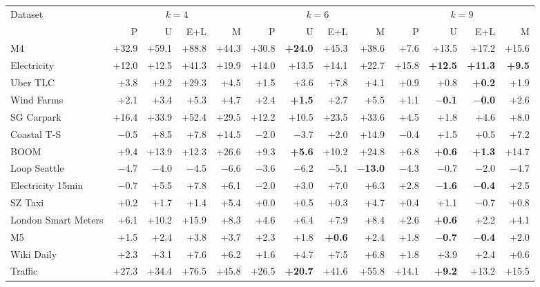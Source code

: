 \begin{tabular}{lrrrrrrrrrrrr}
\toprule
Dataset & \multicolumn{4}{c}{$k=4$} & \multicolumn{4}{c}{$k=6$} & \multicolumn{4}{c}{$k=9$} \\
\cmidrule(lr){2-5}\cmidrule(lr){6-9}\cmidrule(lr){10-13}
 & P & U & E+L & M & P & U & E+L & M & P & U & E+L & M \\
\midrule
M4 & +32.9 & +59.1 & +88.8 & +44.3 & +30.8 & \textbf{+24.0} & +45.3 & +38.6 & +7.6 & +13.5 & +17.2 & +15.6 \\
Electricity & +12.0 & +12.5 & +41.3 & +19.9 & +14.0 & +13.5 & +14.1 & +22.7 & +15.8 & \textbf{+12.5} & \textbf{+11.3} & \textbf{+9.5} \\
Uber TLC & +3.8 & +9.2 & +29.3 & +4.5 & +1.5 & +3.6 & +7.8 & +4.1 & +0.9 & +0.8 & \textbf{+0.2} & +1.9 \\
Wind Farms & +2.1 & +3.4 & +5.3 & +4.7 & +2.4 & \textbf{+1.5} & +2.7 & +5.5 & +1.1 & \textbf{$-$0.1} & \textbf{$-$0.0} & +2.6 \\
SG Carpark & +16.4 & +33.9 & +52.4 & +29.5 & +12.2 & +10.5 & +23.5 & +33.6 & +4.5 & +1.8 & +4.6 & +8.0 \\
Coastal T-S & $-$0.5 & +8.5 & +7.8 & +14.5 & $-$2.0 & $-$3.7 & +2.0 & +14.9 & $-$0.4 & +1.5 & +0.5 & +7.2 \\
BOOM & +9.4 & +13.9 & +12.3 & +26.6 & +9.3 & \textbf{+5.6} & +10.2 & +24.8 & +6.8 & \textbf{+0.6} & \textbf{+1.3} & +14.7 \\
Loop Seattle & $-$4.7 & $-$4.0 & $-$4.5 & $-$6.6 & $-$3.6 & $-$6.2 & $-$5.1 & \textbf{$-$13.0} & $-$4.3 & $-$0.7 & $-$2.0 & $-$4.7 \\
Electricity 15min & $-$0.7 & +5.5 & +7.8 & +6.1 & $-$2.0 & +3.0 & +7.0 & +6.3 & +2.8 & \textbf{$-$1.6} & \textbf{$-$0.4} & +2.5 \\
SZ Taxi & +0.2 & +1.7 & +1.4 & +5.4 & +0.0 & +0.5 & +0.3 & +4.7 & +0.4 & +1.1 & $-$0.7 & +0.8 \\
London Smart Meters & +6.1 & +10.2 & +15.9 & +8.3 & +4.6 & +6.4 & +7.9 & +8.4 & +2.6 & \textbf{+0.6} & +2.2 & +4.1 \\
M5 & +1.5 & +2.4 & +3.8 & +3.7 & +2.3 & +1.8 & \textbf{+0.6} & +2.4 & +1.8 & \textbf{$-$0.7} & \textbf{$-$0.4} & +2.0 \\
Wiki Daily & +2.3 & +3.1 & +7.6 & +6.2 & +1.6 & +4.7 & +7.5 & +6.8 & +1.8 & +3.9 & +2.4 & +0.6 \\
Traffic & +27.3 & +34.4 & +76.5 & +45.8 & +26.5 & \textbf{+20.7} & +41.6 & +55.8 & +14.1 & \textbf{+9.2} & +13.2 & +15.5 \\
\bottomrule
\end{tabular}
